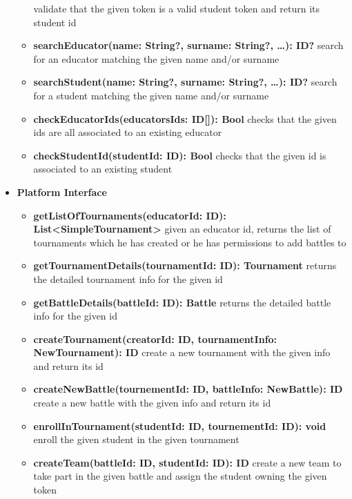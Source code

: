 \begin{itemize}
\begin{itemize}
                    validate that the given token is a valid student token and return its student id
              \item \textbf{searchEducator(name: String?, surname: String?, \ldots): ID?}
                    search for an educator matching the given name and/or surname
              \item \textbf{searchStudent(name: String?, surname: String?, \ldots): ID?}
                    search for a student matching the given name and/or surname
              \item \textbf{checkEducatorIds(educatorsIds: ID[]): Bool}
                    checks that the given ids are all associated to an existing educator
              \item \textbf{checkStudentId(studentId: ID): Bool}
                    checks that the given id is associated to an existing student
          \end{itemize}
    \item \textbf{Platform Interface}
          \begin{itemize}
              \item \textbf{getListOfTournaments(educatorId: ID): List<SimpleTournament>}
                    given an educator id, returns the list of tournaments which he has created
                    or he has permissions to add battles to
              \item \textbf{getTournamentDetails(tournamentId: ID): Tournament}
                    returns the detailed tournament info for the given id
              \item \textbf{getBattleDetails(battleId: ID): Battle}
                    returns the detailed battle info for the given id
              \item \textbf{createTournament(creatorId: ID, tournamentInfo: NewTournament): ID}
                    create a new tournament with the given info and return its id
              \item \textbf{createNewBattle(tournementId: ID, battleInfo: NewBattle): ID}
                    create a new battle with the given info and return its id
              \item \textbf{enrollInTournament(studentId: ID, tournementId: ID): void}
                    enroll the given student in the given tournament
              \item \textbf{createTeam(battleId: ID, studentId: ID): ID}
                    create a new team to take part in the given battle and assign the student owning the given token

\end{itemize}
\end{itemize}
